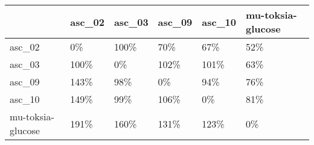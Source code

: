 \begin{tabular}{llllll}
\toprule
{} & asc\_02 & asc\_03 & asc\_09 & asc\_10 & mu-toksia-glucose \\
\midrule
asc\_02            &     0\% &   100\% &    70\% &    67\% &               52\% \\
asc\_03            &   100\% &     0\% &   102\% &   101\% &               63\% \\
asc\_09            &   143\% &    98\% &     0\% &    94\% &               76\% \\
asc\_10            &   149\% &    99\% &   106\% &     0\% &               81\% \\
mu-toksia-glucose &   191\% &   160\% &   131\% &   123\% &                0\% \\
\bottomrule
\end{tabular}
